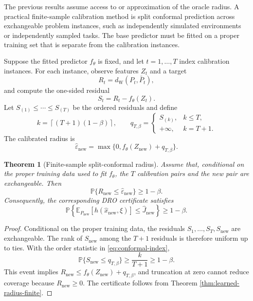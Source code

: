 \documentclass[11pt]{article}
\newtheorem{theorem}{Theorem}[section]
\newcommand{\E}{\mathbb{E}}
\newcommand{\Prob}{\mathbb{P}}
\newcommand{\1}{\mathbf{1}}
\newcommand{\dW}{d_{\mathrm W}}
\begin{document}
The previous results assume access to or approximation of the oracle radius. A practical finite-sample calibration method is split conformal prediction across exchangeable problem instances, such as independently simulated environments or independently sampled tasks. The base predictor must be fitted on a proper training set that is separate from the calibration instances.

Suppose the fitted predictor $f_\theta$ is fixed, and let $t=1,\ldots,T$ index calibration instances. For each instance, observe features $Z_t$ and a target
\begin{equation}
    R_t=\dW(P_t,\bar P_t),
\end{equation}
and compute the one-sided residual
\begin{equation}
    S_t=R_t-f_\theta(Z_t).
\end{equation}
Let $S_{(1)}\le\cdots\le S_{(T)}$ be the ordered residuals and define
\begin{equation}\label{eq:conformal-index}
    k=\left\lceil (T+1)(1-\beta)\right\rceil,
    \qquad
    q_{T,\beta}=\begin{cases}
    S_{(k)},&k\le T,\\
    +\infty,&k=T+1.
    \end{cases}
\end{equation}
The calibrated radius is
\begin{equation}\label{eq:conformal-radius}
    \widehat\varepsilon_{\mathrm{new}}
    =\max\{0,f_\theta(Z_{\mathrm{new}})+q_{T,\beta}\}.
\end{equation}

\begin{theorem}[Finite-sample split-conformal radius]\label{thm:conformal}
Assume that, conditional on the proper training data used to fit $f_\theta$, the $T$ calibration pairs and the new pair are exchangeable. Then
\begin{equation}
    \Prob\{R_{\mathrm{new}}\le \widehat\varepsilon_{\mathrm{new}}\}\ge1-\beta.
\end{equation}
Consequently, the corresponding DRO certificate satisfies
\begin{equation}
    \Prob\left\{\E_{P_{\mathrm{new}}}[h(\widehat x_{\mathrm{new}},\xi)]\le \widehat J_{\mathrm{new}}\right\}\ge1-\beta.
\end{equation}
\end{theorem}

\begin{proof}
Conditional on the proper training data, the residuals $S_1,\ldots,S_T,S_{\mathrm{new}}$ are exchangeable. The rank of $S_{\mathrm{new}}$ among the $T+1$ residuals is therefore uniform up to ties. With the order statistic in \eqref{eq:conformal-index},
\begin{equation}
    \Prob\{S_{\mathrm{new}}\le q_{T,\beta}\}\ge \frac{k}{T+1}\ge1-\beta.
\end{equation}
This event implies $R_{\mathrm{new}}\le f_\theta(Z_{\mathrm{new}})+q_{T,\beta}$, and truncation at zero cannot reduce coverage because $R_{\mathrm{new}}\ge0$. The certificate follows from Theorem \ref{thm:learned-radius-finite}.
\end{proof}
\end{document}
